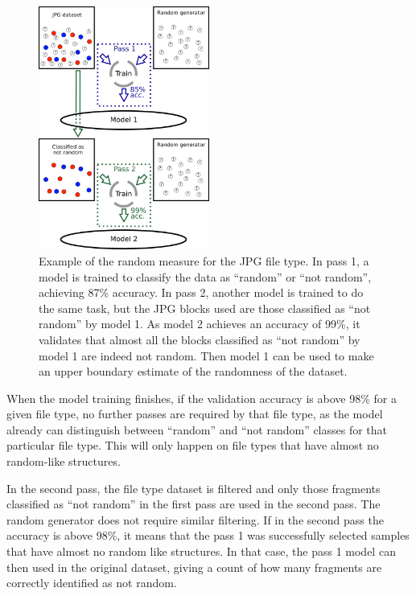 \noindent
\begin{figure}[htb!]
\centering\includegraphics[width=0.5\textwidth]{content/random_measure.png}
\caption{\label{fig:randommeasure}Example of the random measure for the JPG file type. In pass 1, a model is trained to classify the data as ``random'' or ``not random'', achieving 87\% accuracy. In pass 2, another model is trained to do the same task, but the JPG blocks used are those classified as ``not random'' by model 1. As model 2 achieves an accuracy of 99\%, it validates that almost all the blocks classified as ``not random'' by model 1 are indeed not random. Then model 1 can be used to make an upper boundary estimate of the randomness of the dataset.}%
\end{figure}

When the model training finishes, if the validation accuracy is above 98\% for a given file type, no further passes are required by that file type, as the model already can distinguish between ``random'' and ``not random'' classes for that particular file type. This will only happen on file types that have almost no random-like structures.

In the second pass, the file type dataset is filtered and only those fragments classified as ``not random'' in the first pass are used in the second pass. The random generator does not require similar filtering. If in the second pass the accuracy is above 98\%, it means that the pass 1 was successfully selected samples that have almost no random like structures. In that case, the pass 1 model can then used in the original dataset, giving a count of how many fragments are correctly identified as not random.

